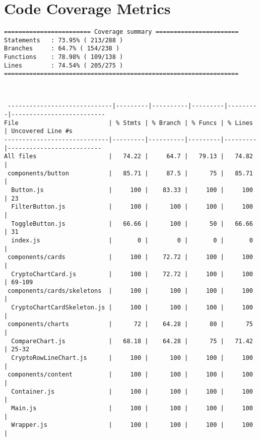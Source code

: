 \documentclass[12pt, titlepage]{article}
\begin{document}
\section{Code Coverage Metrics}
\begin{verbatim}
======================== Coverage summary =======================
Statements   : 73.95% ( 213/288 )
Branches     : 64.7% ( 154/238 )
Functions    : 78.98% ( 109/138 )
Lines        : 74.54% ( 205/275 )
=================================================================
\end{verbatim}
\begin{scriptsize}
\begin{verbatim}


 -----------------------------|---------|----------|---------|---------|--------------------------
File                         | % Stmts | % Branch | % Funcs | % Lines | Uncovered Line #s        
-----------------------------|---------|----------|---------|---------|--------------------------
All files                    |   74.22 |     64.7 |   79.13 |   74.82 |                          
 components/button           |   85.71 |     87.5 |      75 |   85.71 |                          
  Button.js                  |     100 |    83.33 |     100 |     100 | 23                       
  FilterButton.js            |     100 |      100 |     100 |     100 |                          
  ToggleButton.js            |   66.66 |      100 |      50 |   66.66 | 31                       
  index.js                   |       0 |        0 |       0 |       0 |                          
 components/cards            |     100 |    72.72 |     100 |     100 |                          
  CryptoChartCard.js         |     100 |    72.72 |     100 |     100 | 69-109                   
 components/cards/skeletons  |     100 |      100 |     100 |     100 |                          
  CryptoChartCardSkeleton.js |     100 |      100 |     100 |     100 |                          
 components/charts           |      72 |    64.28 |      80 |      75 |                          
  CompareChart.js            |   68.18 |    64.28 |      75 |   71.42 | 25-32                    
  CryptoRowLineChart.js      |     100 |      100 |     100 |     100 |                          
 components/content          |     100 |      100 |     100 |     100 |                          
  Container.js               |     100 |      100 |     100 |     100 |                          
  Main.js                    |     100 |      100 |     100 |     100 |                          
  Wrapper.js                 |     100 |      100 |     100 |     100 |                          

\end{verbatim}
\end{scriptsize}
\end{document}
